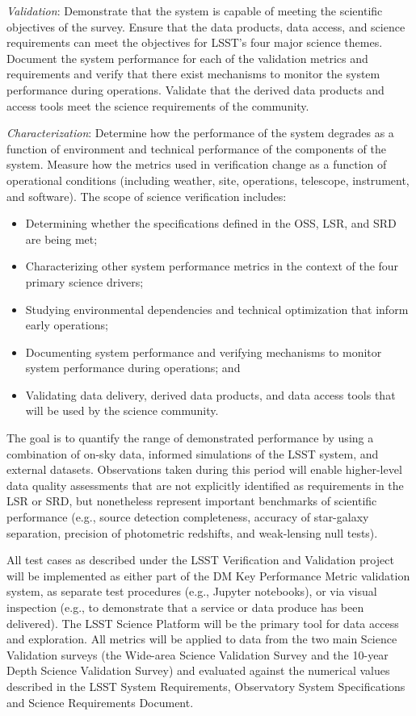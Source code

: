 {\it Validation}: Demonstrate that the system is capable of meeting the scientific objectives of the survey. Ensure that the data products, data access, and science requirements can meet the objectives for LSST’s four major science themes. Document the system performance for each of the validation metrics and requirements and verify that there exist mechanisms to monitor the system performance during operations. Validate that the derived data products and access tools meet the science requirements of the community.

{\it Characterization}: Determine how the performance of the system degrades as a function of environment and technical performance of the components of the system. Measure how the metrics used in verification change as a function of operational conditions (including weather, site, operations, telescope, instrument, and software).
The scope of science verification includes:

\begin{itemize}

	\item Determining whether the specifications defined in the OSS, LSR, and SRD are being met;
	\item Characterizing other system performance metrics in the context of the four primary science drivers;
	\item Studying environmental dependencies and technical optimization that inform early operations;
	\item Documenting system performance and verifying mechanisms to monitor system performance during operations; and
	\item Validating data delivery, derived data products, and data access tools that will be used by the science community.
	
\end{itemize}

The goal is to quantify the range of demonstrated performance by using a combination of on-sky data, informed simulations of the LSST system, and external datasets. Observations taken during this period will enable higher-level data quality assessments that are not explicitly identified as requirements in the LSR or SRD, but nonetheless represent important benchmarks of scientific performance (e.g., source detection completeness, accuracy of star-galaxy separation, precision of photometric redshifts, and weak-lensing null tests). 

All test cases as described under the LSST Verification and Validation  project will be implemented as either part of the DM Key Performance Metric validation system, as separate test procedures (e.g., Jupyter notebooks), or via visual inspection (e.g., to demonstrate that a service or data produce has been delivered). The LSST Science Platform will be the primary tool for data access and exploration. All metrics will be applied to data from the two main Science Validation surveys (the Wide-area Science Validation Survey and the 10-year Depth Science Validation Survey) and evaluated against the numerical values described in the LSST System Requirements, Observatory System Specifications and Science Requirements Document.

